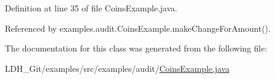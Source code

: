 Definition at line 35 of file Coins\-Example.\-java.



Referenced by examples.\-audit.\-Coins\-Example.\-make\-Change\-For\-Amount().



The documentation for this class was generated from the following file\-:\begin{DoxyCompactItemize}
\item 
L\-D\-H\-\_\-\-Git/examples/src/examples/audit/\hyperlink{_coins_example_8java}{Coins\-Example.\-java}\end{DoxyCompactItemize}

